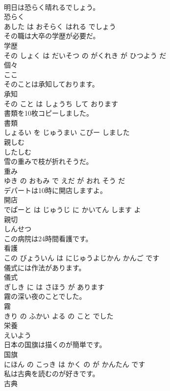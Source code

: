\documentclass[8pt]{extreport}
\begin{document}
\begin{CJK}{UTF8}{min}
\\	明日は恐らく晴れるでしょう。	
\\	恐らく 
\\	あした は おそらく はれる でしょう			
\\	その職は大卒の学歴が必要だ。	
\\	学歴 
\\	その しょく は だいそつ の がくれき が ひつよう だ			
\\	個々	
\\	ここ			
\\	そのことは承知しております。	
\\	承知 
\\	その こと は しょうち して おります			
\\	書類を10枚コピーしました。	
\\	書類 
\\	しょるい を じゅうまい こぴー しました			
\\	親しむ	
\\	したしむ			
\\	雪の重みで枝が折れそうだ。	
\\	重み 
\\	ゆき の おもみ で えだ が おれ そう だ			
\\	デパートは10時に開店しますよ。	
\\	開店 
\\	でぱーと は じゅうじ に かいてん します よ			
\\	親切	
\\	しんせつ			
\\	この病院は24時間看護です。	
\\	看護 
\\	この びょういん は にじゅうよじかん かんご です			
\\	儀式には作法があります。	
\\	儀式 
\\	ぎしき に は さほう が あります			
\\	霧の深い夜のことでした。	
\\	霧 
\\	きり の ふかい よる の こと でした			
\\	栄養	
\\	えいよう			
\\	日本の国旗は描くのが簡単です。	
\\	国旗 
\\	にほん の こっき は かく の が かんたん です			
\\	私は古典を読むのが好きです。	
\\	古典 

\end{CJK}
\end{document}
